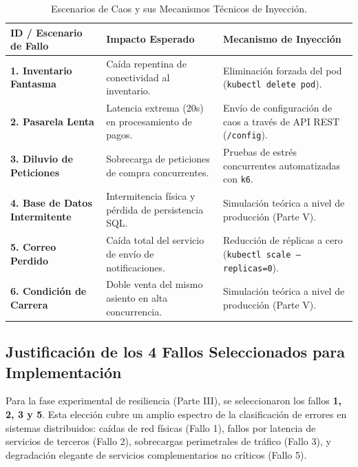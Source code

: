 \documentclass[12pt,letterpaper]{article}
\begin{document}
\begin{table}[h!]
    \centering
    \caption{Escenarios de Caos y sus Mecanismos Técnicos de Inyección.}
    \label{tab:caos}
    \begin{tabularx}{\textwidth}{lXX}
        \toprule
        \textbf{ID / Escenario de Fallo} & \textbf{Impacto Esperado} & \textbf{Mecanismo de Inyección} \\
        \midrule
        \textbf{1. Inventario Fantasma} & Caída repentina de conectividad al inventario. & Eliminación forzada del pod (\texttt{kubectl delete pod}). \\
        \textbf{2. Pasarela Lenta} & Latencia extrema (20s) en procesamiento de pagos. & Envío de configuración de caos a través de API REST (\texttt{/config}). \\
        \textbf{3. Diluvio de Peticiones} & Sobrecarga de peticiones de compra concurrentes. & Pruebas de estrés concurrentes automatizadas con \texttt{k6}. \\
        \textbf{4. Base de Datos Intermitente} & Intermitencia física y pérdida de persistencia SQL. & Simulación teórica a nivel de producción (Parte V). \\
        \textbf{5. Correo Perdido} & Caída total del servicio de envío de notificaciones. & Reducción de réplicas a cero (\texttt{kubectl scale --replicas=0}). \\
        \textbf{6. Condición de Carrera} & Doble venta del mismo asiento en alta concurrencia. & Simulación teórica a nivel de producción (Parte V). \\
        \bottomrule
    \end{tabularx}
\end{table}

\subsection{Justificación de los 4 Fallos Seleccionados para Implementación}
Para la fase experimental de resiliencia (Parte III), se seleccionaron los fallos \textbf{1, 2, 3 y 5}. Esta elección cubre un amplio espectro de la clasificación de errores en sistemas distribuidos: caídas de red físicas (Fallo 1), fallos por latencia de servicios de terceros (Fallo 2), sobrecargas perimetrales de tráfico (Fallo 3), y degradación elegante de servicios complementarios no críticos (Fallo 5).

\newpage

\end{document}
